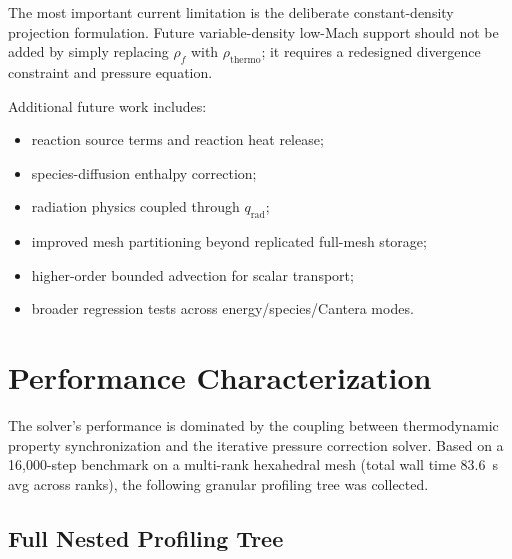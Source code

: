 \documentclass[11pt]{article}
\begin{document}
The most important current limitation is the deliberate constant-density
projection formulation.  Future variable-density low-Mach support should not be
added by simply replacing \(\rho_f\) with \(\rho_{\mathrm{thermo}}\); it requires
a redesigned divergence constraint and pressure equation.

Additional future work includes:
\begin{itemize}[leftmargin=*]
  \item reaction source terms and reaction heat release;
  \item species-diffusion enthalpy correction;
  \item radiation physics coupled through \(q_{\mathrm{rad}}\);
  \item improved mesh partitioning beyond replicated full-mesh storage;
  \item higher-order bounded advection for scalar transport;
  \item broader regression tests across energy/species/Cantera modes.
\end{itemize}


\section{Performance Characterization}

The solver's performance is dominated by the coupling between thermodynamic
property synchronization and the iterative pressure correction solver. Based
on a 16{,}000-step benchmark on a multi-rank hexahedral mesh (total wall time
83.6~s avg across ranks), the following granular profiling tree was collected.

\subsection{Full Nested Profiling Tree}
\end{document}
